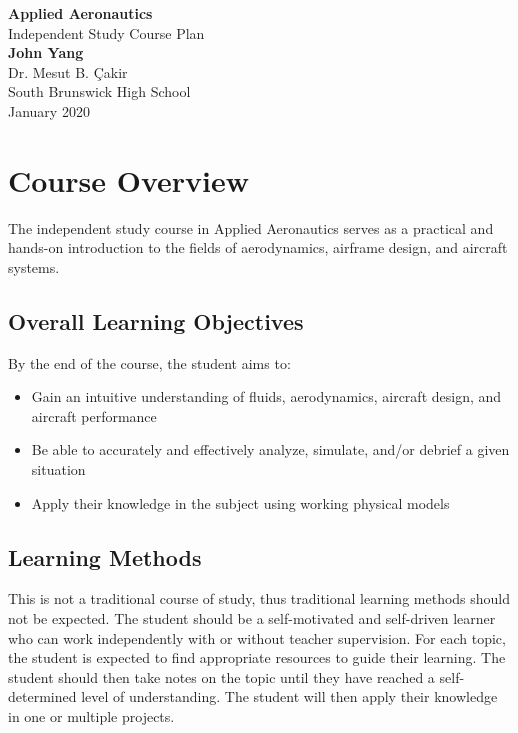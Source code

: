\documentclass[12pt]{article}
\begin{document}
	\begin{titlepage}
		\begin{center}
			\vspace*{1cm}
			\Huge
			\textbf{Applied Aeronautics}\\
			\vspace{0.5cm}
			\LARGE
			Independent Study Course Plan\\
			\vspace{1.5cm}
			\textbf{John Yang}\\
			\vfill
			\vspace{0.8cm}
			\Large
			Dr. Mesut B. \c{C}akir\\
			South Brunswick High School\\
			January 2020
		\end{center}
	\end{titlepage}
\tableofcontents\newpage

\section{Course Overview}
The independent study course in Applied Aeronautics serves as a practical and hands-on introduction to the fields of aerodynamics, airframe design, and aircraft systems. 

\subsection{Overall Learning Objectives}
By the end of the course, the student aims to:
\begin{itemize}
	\item Gain an intuitive understanding of fluids, aerodynamics, aircraft design, and aircraft performance
	\item Be able to accurately and effectively analyze, simulate, and/or debrief a given situation
	\item Apply their knowledge in the subject using working physical models
\end{itemize}
\subsection{Learning Methods}
This is not a traditional course of study, thus traditional learning methods should not be expected. The student should be a self-motivated and self-driven learner who can work independently with or without teacher supervision. For each topic, the student is expected to find appropriate resources to guide their learning. The student should then take notes on the topic until they have reached a self-determined level of understanding. The student will then apply their knowledge in one or multiple projects. 
\end{document}
